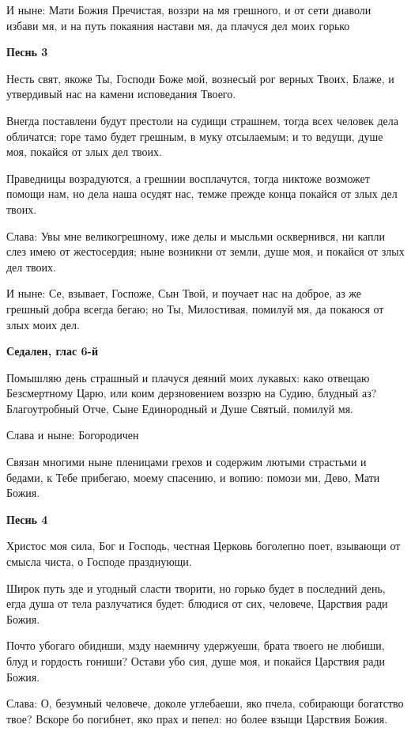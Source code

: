 И ныне: Мати Божия Пречистая, воззри на мя грешного, и от сети диаволи избави мя, и на путь покаяния настави мя, да плачуся дел моих горько


\medskip
\bfseries Песнь 3\normalfont{}\nopagebreak


Несть свят, якоже Ты, Господи Боже мой, вознесый рог верных Твоих, Блаже, и утвердивый нас на камени исповедания Твоего.


Внегда поставлени будут престоли на судищи страшнем, тогда всех человек дела обличатся; горе тамо будет грешным, в муку отсылаемым; и то ведущи, душе моя, покайся от злых дел твоих.

Праведницы возрадуются, а грешнии восплачутся, тогда никтоже возможет помощи нам, но дела наша осудят нас, темже прежде конца покайся от злых дел твоих.


Слава: Увы мне великогрешному, иже делы и мысльми осквернився, ни капли слез имею от жестосердия; ныне возникни от земли, душе моя, и покайся от злых дел твоих.


И ныне: Се, взывает, Госпоже, Сын Твой, и поучает нас на доброе, аз же грешный добра всегда бегаю; но Ты, Милостивая, помилуй мя, да покаюся от злых моих дел.


\medskip
\bfseries Седален, глас 6-й\normalfont{}\nopagebreak


Помышляю день страшный и плачуся деяний моих лукавых: како отвещаю Безсмертному Царю, или коим дерзновением воззрю на Судию, блудный аз? Благоутробный Отче, Сыне Единородный и Душе Святый, помилуй мя.


Слава и ныне: Богородичен


Связан многими ныне пленицами грехов и содержим лютыми страстьми и бедами, к Тебе прибегаю, моему спасению, и вопию: помози ми, Дево, Мати Божия.


\medskip
\bfseries Песнь 4\normalfont{}\nopagebreak


Христос моя сила, Бог и Господь, честная Церковь боголепно поет, взывающи от смысла чиста, о Господе празднующи.


Широк путь зде и угодный сласти творити, но горько будет в последний день, егда душа от тела разлучатися будет: блюдися от сих, человече, Царствия ради Божия.


Почто убогаго обидиши, мзду наемничу удержуеши, брата твоего не любиши, блуд и гордость гониши? Остави убо сия, душе моя, и покайся Царствия ради Божия.


Слава: О, безумный человече, доколе углебаеши, яко пчела, собирающи богатство твое? Вскоре бо погибнет, яко прах и пепел: но более взыщи Царствия Божия.


